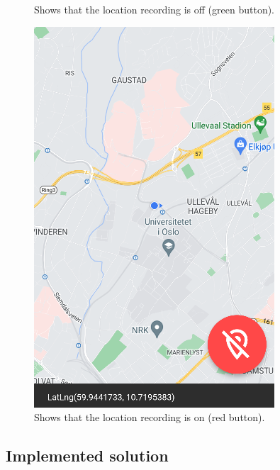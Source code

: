 \documentclass{article}
\begin{document}
\begin{figure}[H]
\begin{minipage}[c]{0.34\linewidth}
        \caption{Shows that the location recording is off (green button).}
        \label{fig:recording_off}
    \end{minipage}
    \hfill
    \begin{minipage}[c]{0.34\linewidth}
        \includegraphics[width=\linewidth]{graphics/recording_on.png}
        \caption{Shows that the location recording is on (red button).}
        \label{fig:recording_on}
    \end{minipage}
\end{figure}

\subsection{Implemented solution}\label{subsec:ImplementedSolution}
\end{document}
